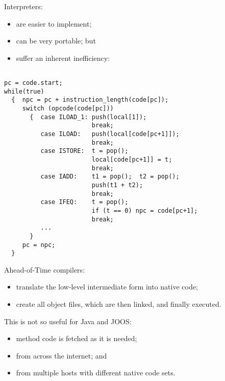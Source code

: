 \begin{slide*}
Interpreters:

\begin{itemize}
\item are easier to implement;
\item can be very portable; but
\item suffer an inherent inefficiency:
\end{itemize}

\begin{tt}
\begin{scriptsize}
\begin{verbatim}

pc = code.start;
while(true)
  {  npc = pc + instruction_length(code[pc]);
     switch (opcode(code[pc]))
       {  case ILOAD_1: push(local[1]);
                        break;
          case ILOAD:   push(local[code[pc+1]]);
                        break;
          case ISTORE:  t = pop();
                        local[code[pc+1]] = t;
                        break;
          case IADD:    t1 = pop();  t2 = pop();
                        push(t1 + t2);
                        break;
          case IFEQ:    t = pop();
                        if (t == 0) npc = code[pc+1];
                        break;
          ...
       }
     pc = npc;
  }
\end{verbatim}
\end{scriptsize}
\end{tt}
\vfil
\end{slide*}
 
\begin{slide*}
Ahead-of-Time compilers:

\begin{itemize}
\item translate the low-level intermediate form into native code;
\item create all object files, which are then linked, and finally executed.
\end{itemize}
\vspace*{1em}

This is not so useful for Java and JOOS:

\begin{itemize}
\item method code is fetched as it is needed;
\item from across the internet; and
\item from multiple hosts with different native code sets.
\end{itemize}
\vfil
\end{slide*}
 
